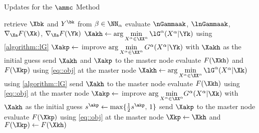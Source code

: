 \begin{algorithm}[t]
	\caption{Updates for the $\ammc$ Method}
	\label{algorithm::amm_c_x}
	\begin{algorithmic}[1]
		\vspace{0.25em}
		\State  retrieve $\Xbk$ and $Y^{\bk}$ from $\beta\in\NN_{\alpha}$\label{line::alg4::comm}
		\vspace{0.1em}
		\State  evaluate $\nGammaak$, $\lnGammaak$, $\nabla_{\Xa} F(\Xk)$, $\nabla_{\Xa} F(\Yk)$ \label{line::alg4::DFaYk}
		\vspace{0.1em}
		\State $\Xakh\gets \arg\min\limits_{X^\alpha\in\XX^\alpha }\lG^\alpha(X^\alpha|\Yk)$ using \cref{algorithm::lG} \label{line::alg4::xlG1}
		\vspace{0.1em}
		\State $\Xakp\gets$ improve $\arg\min\limits_{X^\alpha\in\XX^\alpha }G^\alpha(X^\alpha|\Yk)$ with $\Xakh$ as the initial guess \label{line::alg4::xG1}
		\vspace{0.1em}
		\State  send $\Xakh$ and $\Xakp$ to the master node \label{line::alg4::mcomm1}
		\EndFor
		\vspace{0.1em}
		\State evaluate $F(\Xkh)$ and $F(\Xkp)$ using \cref{eq::obj} \label{line::alg4::Fxk} at the master node
		\vspace{0.1em}
		\label{line::alg4::restart_s1}
		\vspace{0.1em}
		\State $\Xakh\gets \arg\min\limits_{X^\alpha\in\XX^\alpha }\lG^\alpha(X^\alpha|\Xk)$ using \cref{algorithm::lG} \label{line::alg4::xlG2}
		\vspace{0.1em}
		\State  send $\Xakh$ to the master node \label{line::alg4::mcomm2}
		\EndFor
		\vspace{0.1em}
		\State evaluate $F(\Xkh)$ using \cref{eq::obj}\label{line::alg4::Fxkh} at the master node
		\EndIf\label{line::alg4::restart_e1}
		\vspace{0.1em}
		\label{line::alg4::restart_s2}
		\vspace{0.1em}
		\State $\Xakp\gets$ improve $\arg\min\limits_{X^\alpha\in\XX^\alpha }\!G^\alpha(X^\alpha|\Xk)$ with $\Xakh$ as the initial guess \label{line::alg4::xG2}
		\vspace{0.1em}
		\State $s^{\akp}\gets \max\{\tfrac{1}{2}s^{\akp},\,1\}$
		\vspace{0.1em}
		\State  send $\Xakp$ to the master node \label{line::alg4::mcomm3}
		\EndFor
		\vspace{0.1em}
		\State evaluate $F(\Xkp)$ using \cref{eq::obj}\label{line::alg4::Fxkp} at the master node
		\EndIf\label{line::alg4::restart_e2}
		\vspace{0.1em}
		\label{line::alg4::restart_s3}
		\vspace{0.1em}
		\State $\Xkp\gets \Xkh$ and $F(\Xkp)\gets F(\Xkh)$\label{line::alg4::xG3}
		\vspace{0.1em}
		\EndIf\label{line::alg4::restart_e3}
	\end{algorithmic}
\end{algorithm}